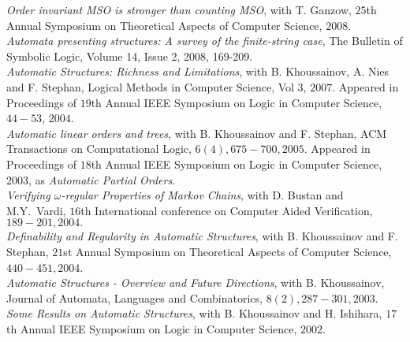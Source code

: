 \documentclass[a4paper]{article}
\begin{document}
{\it Order invariant MSO is stronger than counting MSO}, with T. Ganzow, 
$25$th Annual Symposium on Theoretical Aspects of Computer Science, $2008$.  \\

{\it Automata presenting structures: A survey of the finite-string case}, The Bulletin of Symbolic Logic, 
Volume 14, Issue 2, 2008, 169-209.\\

{\it Automatic Structures: Richness and Limitations}, with B. Khoussainov, A. Nies and F. Stephan, 
Logical Methods in Computer Science, Vol $3$, $2007$. Appeared in Proceedings of 
$19$th Annual {IEEE} Symposium on Logic in Computer Science, $44-53$, $2004$. \\

{\it Automatic linear orders and trees}, with B. Khoussainov and F. Stephan, 
ACM Transactions on Computational Logic,
$6 (4), 675-700, 2005$. Appeared in 
Proceedings of $18$th Annual IEEE Symposium on Logic in Computer Science, $2003$,
as {\it Automatic Partial Orders}.  \\

{\it Verifying $\omega$-regular Properties of Markov Chains}, with D. Bustan and
M.Y.~Vardi, $16$th International conference on Computer Aided Verification,
$189-201, 2004.$ \\

 
{\it Definability and Regularity in Automatic Structures}, with B. Khoussainov
and F. Stephan, $21$st Annual Symposium on Theoretical Aspects of 
Computer Science, $440-451, 2004$.  \\
 
{\it Automatic Structures - Overview and Future Directions}, with 
B. Khoussainov,
Journal of Automata, Languages and Combinatorics, $8(2), 287-301, 2003$. \\

{\it Some Results on Automatic Structures}, with B. Khoussainov
and H. Ishihara, $17$th Annual IEEE Symposium on Logic in Computer Science,
$2002$. \\
\end{document}
